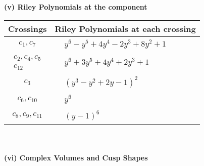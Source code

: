 \documentclass[1p]{elsarticle_modified}
\theoremstyle{definition}
\begin{document}
\newpage\renewcommand{\arraystretch}{1}
\flushleft \textbf{(v) Riley Polynomials at the component}\newline \\
\begin{tabular}{m{50pt}|m{274pt}}
Crossings & \hspace{64pt}Riley Polynomials at each crossing \\
\hline $$\begin{aligned}c_{1},c_{7}\end{aligned}$$&$\begin{aligned}
&y^6- y^5+4 y^4-2 y^3+8 y^2+1
\end{aligned}$\\
\hline $$\begin{aligned}c_{2},c_{4},c_{5}\\c_{12}\end{aligned}$$&$\begin{aligned}
&y^6+3 y^5+4 y^4+2 y^3+1
\end{aligned}$\\
\hline $$\begin{aligned}c_{3}\end{aligned}$$&$\begin{aligned}
&(y^3- y^2+2 y-1)^2
\end{aligned}$\\
\hline $$\begin{aligned}c_{6},c_{10}\end{aligned}$$&$\begin{aligned}
&y^6
\end{aligned}$\\
\hline $$\begin{aligned}c_{8},c_{9},c_{11}\end{aligned}$$&$\begin{aligned}
&(y-1)^6
\end{aligned}$\\
\hline
\end{tabular}\\~\\
\newpage\flushleft \textbf{(vi) Complex Volumes and Cusp Shapes}
\end{document}
